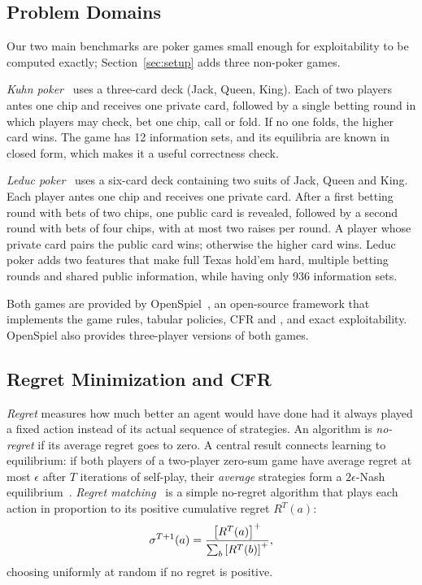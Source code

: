 \subsection{Problem Domains}
\label{sec:domains}

Our two main benchmarks are poker games small enough for exploitability to be computed
exactly; Section~\ref{sec:setup} adds three non-poker games.

\emph{Kuhn poker}~\cite{kuhn1950simplified} uses a three-card deck (Jack, Queen, King). Each of
two players antes one chip and receives one private card, followed by a single betting round
in which players may check, bet one chip, call or fold. If no one folds, the higher card wins. The game has 12 information sets, and its equilibria are known in
closed form, which makes it a useful correctness check.

\emph{Leduc poker}~\cite{southey2005bayes} uses a six-card deck containing two suits of Jack,
Queen and King. Each player antes one chip and receives one private card. After a first betting
round with bets of two chips, one public card is revealed, followed by a second round with bets
of four chips, with at most two raises per round. A player whose private card pairs the public
card wins; otherwise the higher card wins. Leduc poker adds two features that make full
Texas hold'em hard, multiple betting rounds and shared public information, while having only
936 information sets.

Both games are provided by OpenSpiel~\cite{lanctot2019openspiel}, an open-source framework that
implements the game rules, tabular policies, CFR and \cfrp{}, and exact exploitability.
OpenSpiel also provides three-player versions of both games.

\subsection{Regret Minimization and CFR}
\label{sec:cfr}

\emph{Regret} measures how much better an agent would have done had it always played a fixed
action instead of its actual sequence of strategies. An algorithm is \emph{no-regret} if its
average regret goes to zero. A central result connects learning to equilibrium: if both players
of a two-player zero-sum game have average regret at most $\epsilon$ after $T$ iterations of
self-play, their \emph{average} strategies form a $2\epsilon$-Nash
equilibrium~\cite{zinkevich2007regret}. \emph{Regret matching}~\cite{hart2000simple} is a
simple no-regret algorithm that plays each action in proportion to its positive cumulative
regret $R^T(a)$:
\begin{equation}
  \sigma^{T+1}(a) = \frac{\left[R^T(a)\right]^{+}}{\sum_{b}\left[R^T(b)\right]^{+}},
  \label{eq:rm}
\end{equation}
choosing uniformly at random if no regret is positive.

